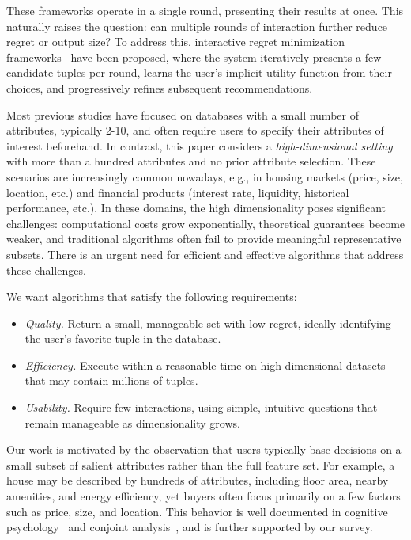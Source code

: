 \documentclass[conference]{IEEEtran}
\theoremstyle{definition}
\theoremstyle{plain}
\begin{document}
These frameworks operate in a single round, presenting their results at once. This naturally raises the question: can multiple rounds of interaction further reduce regret or output size? To address this, interactive regret minimization frameworks~\cite{NL12, XCL19} have been proposed, where the system iteratively presents a few candidate tuples per round, learns the user’s implicit utility function from their choices, and progressively refines subsequent recommendations.

Most previous studies have focused on databases with a small number of attributes, typically 2-10, and often require users to specify their attributes of interest beforehand. In contrast, this paper considers a \textit{high-dimensional setting} with more than a hundred attributes and no prior attribute selection. These scenarios are increasingly common nowadays, e.g., in housing markets (price, size, location, etc.) and financial products (interest rate, liquidity, historical performance, etc.). In these domains, the high dimensionality poses significant challenges: computational costs grow exponentially, theoretical guarantees become weaker, and traditional algorithms often fail to provide meaningful representative subsets. There is an urgent need for efficient and effective algorithms that address these challenges.

We want algorithms that satisfy the following requirements:

\begin{itemize}[beginpenalty=10000]
    \item \textit{Quality.} Return a small, manageable set with low regret, ideally identifying the user’s favorite tuple in the database.
    
    \item \textit{Efficiency.} Execute within a reasonable time on high-dimensional datasets that may contain millions of tuples.
    
    \item \textit{Usability.} Require few interactions, using simple, intuitive questions that remain manageable as dimensionality grows.
\end{itemize}

Our work is motivated by the observation that users typically base decisions on a small subset of salient attributes rather than the full feature set. For example, a house may be described by hundreds of attributes, including floor area, nearby amenities, and energy efficiency, yet buyers often focus primarily on a few factors such as price, size, and location. This behavior is well documented in cognitive psychology~\cite{GG96, GA12, MH99, GG99} and conjoint analysis~\cite{WX22, SC05, TK03, DMW12}, and is further supported by our survey.
\end{document}
